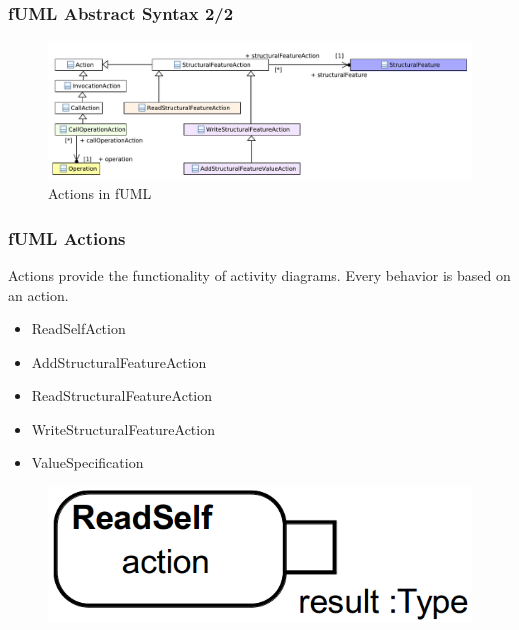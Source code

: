 \documentclass{beamer}
\begin{document}
\begin{frame}
\frametitle{fUML Abstract Syntax 2/2}
\begin{figure}[h!t]
 \centering
 \includegraphics[scale=0.5]{images/Model_Model_Behavior}
 \caption{Actions in fUML}
 \label{fig:behavior}
\end{figure}
\end{frame}

\begin{frame}
 \frametitle{fUML Actions}
 Actions provide the functionality of activity diagrams. Every behavior is based on an action.
 \begin{itemize}
  \item ReadSelfAction
  \item AddStructuralFeatureAction
  \item ReadStructuralFeatureAction
  \item WriteStructuralFeatureAction
  \item ValueSpecification
 \end{itemize}
\begin{figure}[h!t]
 \centering
 \includegraphics[scale=0.18]{images/fuml-actions/ReadSelf.png}
\end{figure}
\end{frame}
\end{document}

